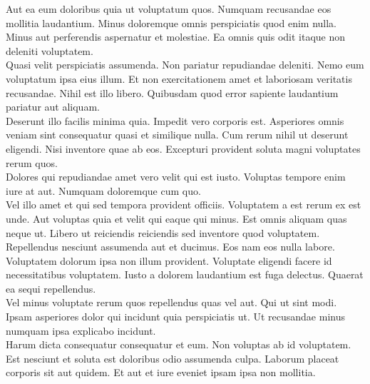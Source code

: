 \documentclass[11pt, a4paper]{awesome-cv}
\begin{document}
\begin{cvletter}
  \vspace{3mm}

  \normalsize Aut ea eum doloribus quia ut voluptatum quos. Numquam recusandae eos mollitia laudantium. Minus doloremque omnis perspiciatis quod enim nulla. Minus aut perferendis aspernatur et molestiae. Ea omnis quis odit itaque non deleniti voluptatem.\\

Quasi velit perspiciatis assumenda. Non pariatur repudiandae deleniti. Nemo eum voluptatum ipsa eius illum. Et non exercitationem amet et laboriosam veritatis recusandae. Nihil est illo libero. Quibusdam quod error sapiente laudantium pariatur aut aliquam.\\

Deserunt illo facilis minima quia. Impedit vero corporis est. Asperiores omnis veniam sint consequatur quasi et similique nulla. Cum rerum nihil ut deserunt eligendi. Nisi inventore quae ab eos. Excepturi provident soluta magni voluptates rerum quos.\\

Dolores qui repudiandae amet vero velit qui est iusto. Voluptas tempore enim iure at aut. Numquam doloremque cum quo.\\

Vel illo amet et qui sed tempora provident officiis. Voluptatem a est rerum ex est unde. Aut voluptas quia et velit qui eaque qui minus. Est omnis aliquam quas neque ut. Libero ut reiciendis reiciendis sed inventore quod voluptatem.\\

Repellendus nesciunt assumenda aut et ducimus. Eos nam eos nulla labore. Voluptatem dolorum ipsa non illum provident. Voluptate eligendi facere id necessitatibus voluptatem. Iusto a dolorem laudantium est fuga delectus. Quaerat ea sequi repellendus.\\

Vel minus voluptate rerum quos repellendus quas vel aut. Qui ut sint modi. Ipsam asperiores dolor qui incidunt quia perspiciatis ut. Ut recusandae minus numquam ipsa explicabo incidunt.\\

Harum dicta consequatur consequatur et eum. Non voluptas ab id voluptatem. Est nesciunt et soluta est doloribus odio assumenda culpa. Laborum placeat corporis sit aut quidem. Et aut et iure eveniet ipsam ipsa non mollitia.\\

\vspace{-4.5mm}

\end{cvletter}


\makeletterclosing
\end{document}
